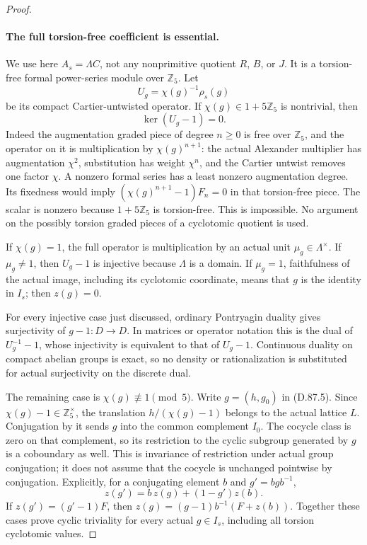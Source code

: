 \begin{proof}
\paragraph{The full torsion-free coefficient is essential.}
We use here \(A_s=\Lambda C\), not any nonprimitive quotient
\(R\), \(B\), or \(J\). It is a torsion-free formal power-series
module over \(\mathbb Z_5\). Let
\[
                     U_g=\chi(g)^{-1}\rho_s(g)
\]
be its compact Cartier-untwisted operator. If
\(\chi(g)\in1+5\mathbb Z_5\) is nontrivial, then
\[
                         \ker(U_g-1)=0.               \tag{D.87.6}
\]
Indeed the augmentation graded piece of degree \(n\ge0\)
is free over \(\mathbb Z_5\), and the operator on it is
multiplication by \(\chi(g)^{n+1}\): the actual Alexander
multiplier has augmentation \(\chi^2\), substitution has
weight \(\chi^n\), and the Cartier untwist removes one
factor \(\chi\). A nonzero formal series has a least
nonzero augmentation degree. Its fixedness would imply
\((\chi(g)^{n+1}-1)F_n=0\) in that torsion-free piece.
The scalar is nonzero because \(1+5\mathbb Z_5\) is
torsion-free. This is impossible. No argument on the possibly
torsion graded pieces of a cyclotomic quotient is used.

If \(\chi(g)=1\), the full operator is multiplication by
an actual unit \(\mu_g\in\Lambda^\times\). If
\(\mu_g\ne1\), then \(U_g-1\) is injective because
\(\Lambda\) is a domain. If \(\mu_g=1\), faithfulness
of the actual image, including its cyclotomic coordinate,
means that \(g\) is the identity in \(I_s\); then
\(z(g)=0\).

For every injective case just discussed, ordinary Pontryagin
duality gives surjectivity of \(g-1:D\to D\). In matrices
or operator notation this is the dual of
\(U_g^{-1}-1\), whose injectivity is equivalent to that of
\(U_g-1\). Continuous duality on compact abelian groups is
exact, so no density or rationalization is substituted for
actual surjectivity on the discrete dual.

The remaining case is \(\chi(g)\not\equiv1\pmod5\).
Write \(g=(h,g_0)\) in (D.87.5). Since
\(\chi(g)-1\in\mathbb Z_5^\times\), the translation
\(h/(\chi(g)-1)\) belongs to the actual lattice \(L\).
Conjugation by it sends \(g\) into the common complement
\(I_0\). The cocycle class is zero on that complement,
so its restriction to the cyclic subgroup generated by
\(g\) is a coboundary as well. This is invariance of
restriction under actual group conjugation; it does not
assume that the cocycle is unchanged pointwise by conjugation.
Explicitly, for a conjugating element \(b\) and
\(g'=bgb^{-1}\),
\[
 z(g')=b\,z(g)+(1-g')z(b).
\]
If \(z(g')=(g'-1)F\), then
\(z(g)=(g-1)b^{-1}(F+z(b))\).
Together these cases prove cyclic triviality for every actual
\(g\in I_s\), including all torsion cyclotomic values.


\end{proof}
